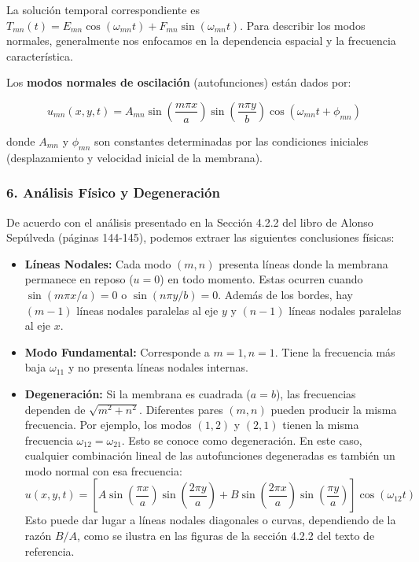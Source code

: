 \documentclass[a4paper]{article}
\begin{document}
La solución temporal correspondiente es $T_{mn}(t) = E_{mn} \cos(\omega_{mn} t) + F_{mn} \sin(\omega_{mn} t)$. Para describir los modos normales, generalmente nos enfocamos en la dependencia espacial y la frecuencia característica.

Los \textbf{modos normales de oscilación} (autofunciones) están dados por:

\begin{equation}
u_{mn}(x, y, t) = A_{mn} \sin\left(\frac{m \pi x}{a}\right) \sin\left(\frac{n \pi y}{b}\right) \cos(\omega_{mn} t + \phi_{mn})
\end{equation}

donde $A_{mn}$ y $\phi_{mn}$ son constantes determinadas por las condiciones iniciales (desplazamiento y velocidad inicial de la membrana).

\subsubsection{6. Análisis Físico y Degeneración}

De acuerdo con el análisis presentado en la Sección 4.2.2 del libro de Alonso Sepúlveda (páginas 144-145), podemos extraer las siguientes conclusiones físicas:

\begin{itemize}
    \item \textbf{Líneas Nodales:} Cada modo $(m, n)$ presenta líneas donde la membrana permanece en reposo ($u=0$) en todo momento. Estas ocurren cuando $\sin(m \pi x/a) = 0$ o $\sin(n \pi y/b) = 0$. Además de los bordes, hay $(m-1)$ líneas nodales paralelas al eje $y$ y $(n-1)$ líneas nodales paralelas al eje $x$.
    
    \item \textbf{Modo Fundamental:} Corresponde a $m=1, n=1$. Tiene la frecuencia más baja $\omega_{11}$ y no presenta líneas nodales internas.
    
    \item \textbf{Degeneración:} Si la membrana es cuadrada ($a = b$), las frecuencias dependen de $\sqrt{m^2 + n^2}$. Diferentes pares $(m, n)$ pueden producir la misma frecuencia. Por ejemplo, los modos $(1, 2)$ y $(2, 1)$ tienen la misma frecuencia $\omega_{12} = \omega_{21}$. Esto se conoce como degeneración. En este caso, cualquier combinación lineal de las autofunciones degeneradas es también un modo normal con esa frecuencia:
    \begin{equation}
    u(x, y, t) = [A \sin\left(\frac{\pi x}{a}\right) \sin\left(\frac{2\pi y}{a}\right) + B \sin\left(\frac{2\pi x}{a}\right) \sin\left(\frac{\pi y}{a}\right)] \cos(\omega_{12} t)
    \end{equation}
    Esto puede dar lugar a líneas nodales diagonales o curvas, dependiendo de la razón $B/A$, como se ilustra en las figuras de la sección 4.2.2 del texto de referencia.
\end{itemize}
\end{document}

